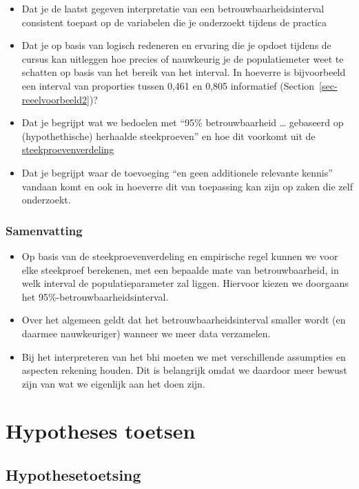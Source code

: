 \documentclass[
  letterpaper,
  DIV=11,
  numbers=noendperiod]{scrreprt}
\begin{document}
\begin{itemize}
\item
  Dat je de laatst gegeven interpretatie van een
  betrouwbaarheidsinterval consistent toepast op de variabelen die je
  onderzoekt tijdens de practica
\item
  Dat je op basis van logisch redeneren en ervaring die je opdoet
  tijdens de cursus kan uitleggen hoe precies of nauwkeurig je de
  populatiemeter weet te schatten op basis van het bereik van het
  interval. In hoeverre is bijvoorbeeld een interval van proporties
  tussen 0,461 en 0,805 informatief (Section~\ref{sec-reeelvoorbeeld2})?
\item
  Dat je begrijpt wat we bedoelen met ``95\% betrouwbaarheid \ldots{}
  gebaseerd op (hypothethische) herhaalde steekproeven'' en hoe dit
  voorkomt uit de
  \hyperref[sec-steekproefcentraallimiet]{steekproevenverdeling}
\item
  Dat je begrijpt waar de toevoeging ``en geen additionele relevante
  kennis'' vandaan komt en ook in hoeverre dit van toepassing kan zijn
  op zaken die zelf onderzoekt.
\end{itemize}

\section{Samenvatting}\label{samenvatting-2}

\begin{itemize}
\item
  Op basis van de steekproevenverdeling en empirische regel kunnen we
  voor elke steekproef berekenen, met een bepaalde mate van
  betrouwbaarheid, in welk interval de populatieparameter zal liggen.
  Hiervoor kiezen we doorgaans het 95\%-betrouwbaarheidsinterval.
\item
  Over het algemeen geldt dat het betrouwbaarheidsinterval smaller wordt
  (en daarmee nauwkeuriger) wanneer we meer data verzamelen.
\item
  Bij het interpreteren van het bhi moeten we met verschillende
  assumpties en aspecten rekening houden. Dit is belangrijk omdat we
  daardoor meer bewust zijn van wat we eigenlijk aan het doen zijn.
\end{itemize}

\part{Hypotheses toetsen}

\chapter{Hypothesetoetsing}\label{hypothesetoetsing}
\end{document}
